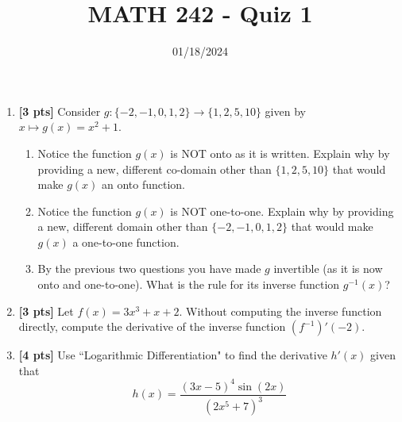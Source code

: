 \documentclass[12pt]{article}
\title{MATH 242 - Quiz 1}
\date{01/18/2024}
\begin{document}
\maketitle


\begin{enumerate}

\item \textbf{[3 pts]} Consider $g:\{-2,-1,0,1,2\}\to\{1,2,5,10\}$ given by $x\mapsto g(x)=x^2+1$. 

\begin{enumerate}
    \item Notice the function $g(x)$ is NOT onto as it is written. Explain why by providing a new, different co-domain other than $\{1,2,5,10\}$ that would make $g(x)$ an onto function.
    \vspace{1.25cm}
    \item Notice the function $g(x)$ is NOT one-to-one. Explain why by providing a new, different domain other than $\{-2,-1,0,1,2\}$ that would make $g(x)$ a one-to-one function.
    \vspace{1.25cm}
    \item By the previous two questions you have made $g$ invertible (as it is now onto and one-to-one). What is the rule for its inverse function $g^{-1}(x)$?
     \vspace{1.25cm}
\end{enumerate}


\item \textbf{[3 pts]} Let $f(x)=3x^3+x+2$. Without computing the inverse function directly, compute the derivative of the inverse function $(f^{-1})'(-2)$.

\vfill

\pagebreak

\item \textbf{[4 pts]} Use ``Logarithmic Differentiation" to find the derivative $h'(x)$ given that
$$h(x)=\frac{(3x-5)^4\sin(2x)}{(2x^5+7)^3}$$
\end{enumerate}
\end{document}
